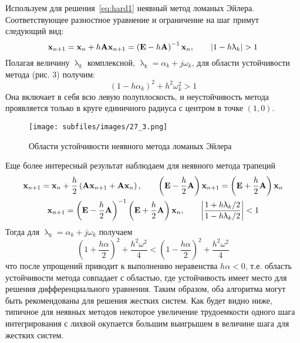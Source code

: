 Используем для решения~\eqref{eq:hard1} неявный метод ломаных Эйлера. Соответствующее разностное уравнение и
ограничение на шаг примут следующий вид:
\begin{equation*}
    \bf{x}_{n+1} = \bf{x}_n + h\bf{A}\bf{x}_{n+1} = \left( \bf{E} - h\bf{A} \right)^{-1}\bf{x}_n, \qquad |1 - h\uplambda_k| > 1
\end{equation*}
Полагая величину $\uplambda_k$ комплексной, $\uplambda_k = \alpha_k + j\omega_k$, для области устойчивости метода (рис. 3)
получим:
\begin{equation*}
    \left( 1 - h\alpha_k \right)^2 + h^2 \omega_k^2 > 1
\end{equation*}
Она включает в себя всю левую полуплоскость, и неустойчивость метода проявляется только в круге единичного радиуса с
центром в точке $(1, 0)$.
\begin{figure}[H]
    \centering
    \texttt{[image: subfiles/images/27\_3.png]}
    \caption{Области устойчивости неявного метода ломаных Эйлера}
\end{figure}
Еще более интересный результат наблюдаем для неявного метода трапеций
\begin{gather*}
    \bf{x}_{n+1} = \bf{x}_n + \frac{h}{2}\left( \bf{A}\bf{x}_{n+1} + \bf{A}\bf{x}_n \right), \qquad \left( \bf{E} - \frac{h}{2}\bf{A} \right)\bf{x}_{n+1} = \left( \bf{E} + \frac{h}{2}\bf{A} \right)\bf{x}_n \\
    \bf{x}_{n+1} = \left( \bf{E} - \frac{h}{2}\bf{A} \right)^{-1} \left( \bf{E} + \frac{h}{2}\bf{A} \right)\bf{x}_n, \qquad \left| \frac{1 + h\uplambda_k/2}{1 - h\uplambda_k/2} \right| < 1
\end{gather*}
Тогда для $\uplambda_k = \alpha_k + j\omega_k$ получаем
\begin{equation*}
    \left( 1 + \frac{h\alpha}{2} \right)^2 + \frac{h^2 \omega^2}{4} < \left( 1 - \frac{h\alpha}{2} \right)^2 + \frac{h^2 \omega^2}{4}
\end{equation*}
что после упрощений приводит к выполнению неравенства $h\alpha < 0$, т.е. область устойчивости метода совпадает с
областью, где устойчивость имеет место для решения дифференциального уравнения. Таким образом, оба алгоритма могут
быть рекомендованы для решения жестких систем. Как будет видно ниже, типичное для неявных методов некоторое увеличение
трудоемкости одного шага интегрирования с лихвой окупается большим выигрышем в величине шага для жестких систем.
